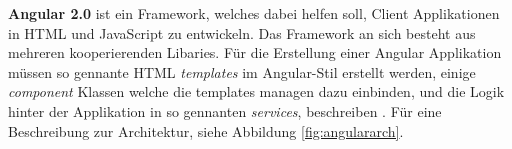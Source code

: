 \textbf{Angular 2.0} ist ein Framework, welches dabei helfen soll, Client Applikationen in HTML und JavaScript zu entwickeln. Das Framework an sich besteht aus mehreren kooperierenden Libaries. Für die Erstellung einer Angular Applikation müssen so gennante HTML \textit{templates} im Angular-Stil erstellt werden, einige \textit{component} Klassen welche die templates managen dazu einbinden, und die Logik hinter der Applikation in so gennanten \textit{services}, beschreiben \cite{MELD.CH3-web-app.angular}. Für eine Beschreibung zur Architektur, siehe Abbildung \ref{fig:angulararch}.

\clearpage

\begin{table}[!htb]
\centering
{}
\end{table}
